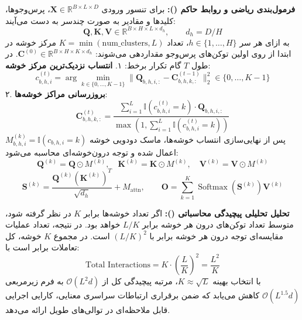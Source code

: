 \textbf{فرمول‌بندی ریاضی و روابط حاکم ():}
برای تنسور ورودی $\mathbf{X} \in \mathbb{R}^{B \times L \times D}$، پرس‌وجوها، کلیدها و مقادیر به صورت چندسر به دست می‌آیند:
\begin{equation}
\mathbf{Q}, \mathbf{K}, \mathbf{V} \in \mathbb{R}^{B \times H \times L \times d_h}, \qquad d_h = D / H
\end{equation}
به ازای هر سر $h \in \{1, \dots, H\}$، تعداد $K = \min(\text{num\_clusters}, L)$ مرکز خوشه در ابتدا از روی اولین توکن‌های پرس‌وجو مقداردهی می‌شوند: $\mathbf{C}^{(0)} \in \mathbb{R}^{B \times H \times K \times d_h}$.
در طول $T$ گام تکرار برخط:
۱. \textbf{انتساب نزدیک‌ترین مرکز خوشه}:
\begin{equation}
c_{b, h, i}^{(t)} = \arg\min_{k \in \{0, \dots, K-1\}} \|\mathbf{Q}_{b, h, i, :} - \mathbf{C}_{b, h, k, :}^{(t-1)}\|_2^2 \in \{0, \dots, K-1\}
\end{equation}
۲. \textbf{بروزرسانی مراکز خوشه‌ها}:
\begin{equation}
\mathbf{C}_{b, h, k, :}^{(t)} = \frac{\sum_{i=1}^L \mathbb{I}(c_{b, h, i}^{(t)} = k) \cdot \mathbf{Q}_{b, h, i, :}}{\max\left(1, \sum_{i=1}^L \mathbb{I}(c_{b, h, i}^{(t)} = k)\right)}
\end{equation}
پس از نهایی‌سازی انتساب خوشه‌ها، ماسک دودویی خوشه $M_{b, h, i}^{(k)} = \mathbb{I}(c_{b, h, i} = k)$ اعمال شده و توجه درون‌خوشه‌ای محاسبه می‌شود:
\begin{equation}
\mathbf{Q}^{(k)} = \mathbf{Q} \odot M^{(k)}, \quad \mathbf{K}^{(k)} = \mathbf{K} \odot M^{(k)}, \quad \mathbf{V}^{(k)} = \mathbf{V} \odot M^{(k)}
\end{equation}
\begin{equation}
\mathbf{S}^{(k)} = \frac{\mathbf{Q}^{(k)} (\mathbf{K}^{(k)})^T}{\sqrt{d_h}} + M_{\text{attn}}, \qquad
\mathbf{O} = \sum_{k=1}^K \operatorname{Softmax}(\mathbf{S}^{(k)}) \mathbf{V}^{(k)}
\end{equation}

\textbf{تحلیل تحلیلی پیچیدگی محاسباتی ():}
اگر تعداد خوشه‌ها برابر $K$ در نظر گرفته شود، متوسط تعداد توکن‌های درون هر خوشه برابر $L / K$ خواهد بود. در نتیجه، تعداد عملیات مقایسه‌ای توجه درون هر خوشه برابر با $(L/K)^2$ است. در مجموع $K$ خوشه، کل تعاملات برابر است با:
\begin{equation}
\text{Total Interactions} = K \cdot \left(\frac{L}{K}\right)^2 = \frac{L^2}{K}
\end{equation}
با انتخاب بهینه $K \approx \sqrt{L}$، مرتبه پیچیدگی کل از $\mathcal{O}(L^2 d)$ به فرم زیرمربعی $\mathcal{O}(L^{1.5} d)$ کاهش می‌یابد که ضمن برقراری ارتباطات سراسری معنایی، کارایی اجرایی قابل ملاحظه‌ای در توالی‌های طویل ارائه می‌دهد.



